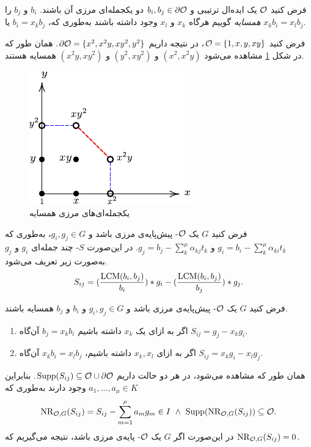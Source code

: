 \begin{definition}
	فرض کنید 
	${\mathcal O}$
	یک ایده‌ال ترتیبی و 
	$b_{i}, b_{j}\in \partial\mathcal{O}$
	دو یکجمله‌ای مرزی آن باشند. 
$b_{i}$
و
$b_{j}$
را 
\textit{همسایه}
گوییم هرگاه 
$x_{k}$
و
$x_{l}$
وجود داشته باشند به‌طوری که، 
$b_{i} = x_{k}b_{j}$
یا 
$x_{k}b_{i} = x_{l}b_{j}$.
\end{definition}
\begin{example}
فرض کنید 
${\mathcal O} = \{1, x, y, xy\}$،
در نتیجه داریم 
$\partial\mathcal{O} = \{x^{2},x^{2}y, xy^{2}, y^{2}\}$.
همان طور که در شکل 
\ref{fig:neighbors}
مشاهده می‌شود 
$(x^{2}, x^{2}y)$
و
$(y^{2}, xy^{2})$
و
$(x^{2}y, xy^{2})$
همسایه هستند. 
\begin{figure}[H]
\centering
\includegraphics[width=0.5\linewidth]{Images/neighbors}
\caption{یکجمله‌ای‌های مرزی همسایه}
\label{fig:neighbors}
\end{figure}

\end{example}

\begin{definition}
فرض کنید 
$G$
یک 
${\mathcal O}$-
پیش‌پایه‌ی مرزی باشد و 
$g_{i}, g_{j}\in G$،
به‌طوری که 
$g_{i} = b_{i} - \sum_{k}^{\mu}\alpha_{ki}t_{k}$
و
$g_{j} = b_{j} - \sum_{k}^{\mu}\alpha_{kj}t_{k}$.
در این‌صورت 
$S$-
چند جمله‌ای 
$g_{i}$
و
$g_{j}$
به‌صورت زیر تعریف می‌شود.
$$S_{ij} = (\frac{\operatorname{\mathrm{LCM}}(b_{i},b_{j})}{b_{i}})*g_{i} - (\frac{\operatorname{\mathrm{LCM}}(b_{i}, b_{j})}{b_{j}})*g_{j}.$$
\end{definition}

\begin{remark}
فرض کنید 
$G$
یک 
${\mathcal O}$-
پیش‌پایه‌ی مرزی باشد و 
$g_{i}, g_{j}\in G$
و 
$b_{i}$
و
$b_{j}$
همسایه باشند. 
\begin{enumerate}
\item
اگر  به ازای یک 
$x_{k}$
داشته باشیم 
$b_{j} = x_{k}b_{i}$
آن‌گاه 
$S_{ij} = g_{j} - x_{k}g_{i}$.
\item
اگر به ازای 
$x_{k}, x_{l}$
داشته باشیم، 
$x_{k}b_{i} = x_{l}b_{j}$
آن‌گاه 
$S_{ij} = x_{k}g_{i} - x_{l}g_{j}$.
\end{enumerate}
همان طور که مشاهده می‌شود، در هر دو حالت داریم 
$\operatorname{\mathrm{Supp}}(S_{ij})\subseteq {\mathcal O}\cup\partial\mathcal{O}$.
 بنابراین 
 $a_{1},...,a_{\mu}\in K$
وجود دارند به‌طوری که
$$\nr_{\mO,G}(S_{ij}) = S_{ij} - \sum_{m = 1}^{\mu}a_{m}g_{m}\in I \ \wedge \ \Supp(\nr_{\mO,G}(S_{ij}))\subseteq \mO.$$
در این‌صورت اگر 
$G$
یک 
${\mathcal O}$-
پایه‌ی مرزی باشد، نتیجه می‌گیریم که 
$\operatorname{\mathrm{NR}}_{{\mathcal O}, G}(S_{ij}) = 0$.
\end{remark}

